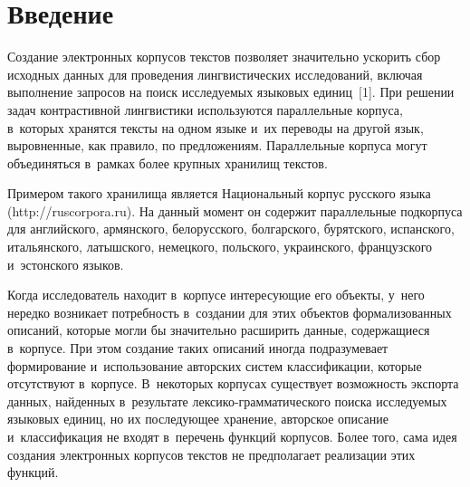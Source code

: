 

\vspace*{4pt}


\thispagestyle{headings}

\begin{multicols}{2}

\label{st\stat}

\section{Введение}

\vspace*{-2pt}

  Создание электронных корпусов текстов позволяет значительно ускорить 
сбор исходных данных для проведения лингвистических исследований, 
включая выполнение запросов на поиск исследуемых языковых единиц~[1]. 
При решении задач контрастивной лингвистики используются параллельные 
корпуса, в~которых хранятся тексты на одном языке и~их переводы на другой 
язык, выровненные, как правило, по предложениям. Параллельные корпуса 
могут объединяться в~рамках более крупных хранилищ текстов. 
  
  Примером такого хранилища является Национальный корпус русского 
языка ({\sf http://ruscorpora.\linebreak ru}). На данный момент он содержит параллельные 
подкорпуса для английского, армянского, белорусского, болгарского, 
бурятского, испанского, итальянского, латышского, немецкого, польского, 
украинского, французского и~эстонского языков.
  
  Когда исследователь находит в~корпусе интересующие его объекты, 
у~него нередко возникает потребность в~создании для этих объектов 
формализованных описаний, которые могли бы значительно расширить 
данные, содержащиеся в~корпу\-се. При этом создание таких описаний иногда 
подразумевает формирование и~использование авторских сис\-тем 
классификации, которые отсутствуют в~корпусе. В~некоторых корпусах 
существует возможность экспорта данных, найденных в~результате  
лек\-си\-ко-грам\-ма\-ти\-че\-ско\-го поиска исследуемых языковых единиц, 
но их последующее хранение, авторское описание и~классификация не 
входят в~перечень функций корпусов. Более того, сама идея создания 
электронных корпусов текстов не предполагает реализации этих функций.
  

\end{multicols}
